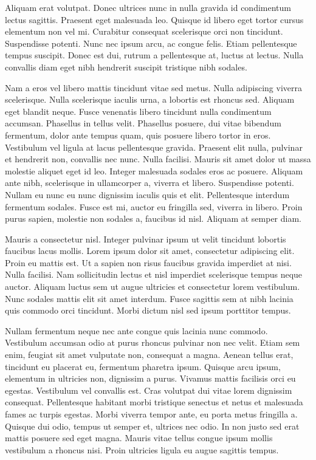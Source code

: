 Aliquam erat volutpat.
Donec ultrices nunc in nulla gravida id condimentum lectus sagittis.
Praesent eget malesuada leo.
Quisque id libero eget tortor cursus elementum non vel mi.
Curabitur consequat scelerisque orci non tincidunt.
Suspendisse potenti.
Nunc nec ipsum arcu, ac congue felis.
Etiam pellentesque tempus suscipit.
Donec est dui, rutrum a pellentesque at, luctus at lectus.
Nulla convallis diam eget nibh hendrerit suscipit tristique nibh sodales.

Nam a eros vel libero mattis tincidunt vitae sed metus.
Nulla adipiscing viverra scelerisque.
Nulla scelerisque iaculis urna, a lobortis est rhoncus sed.
Aliquam eget blandit neque.
Fusce venenatis libero tincidunt nulla condimentum accumsan.
Phasellus in tellus velit.
Phasellus posuere, dui vitae bibendum fermentum, dolor ante tempus quam, quis posuere libero tortor in eros.
Vestibulum vel ligula at lacus pellentesque gravida.
Praesent elit nulla, pulvinar et hendrerit non, convallis nec nunc.
Nulla facilisi.
Mauris sit amet dolor ut massa molestie aliquet eget id leo.
Integer malesuada sodales eros ac posuere.
Aliquam ante nibh, scelerisque in ullamcorper a, viverra et libero.
Suspendisse potenti.
Nullam eu nunc eu nunc dignissim iaculis quis et elit.
Pellentesque interdum fermentum sodales.
Fusce est mi, auctor eu fringilla sed, viverra in libero.
Proin purus sapien, molestie non sodales a, faucibus id nisl.
Aliquam at semper diam.

Mauris a consectetur nisl.
Integer pulvinar ipsum ut velit tincidunt lobortis faucibus lacus mollis.
Lorem ipsum dolor sit amet, consectetur adipiscing elit.
Proin eu mattis est.
Ut a sapien non risus faucibus gravida imperdiet at nisi.
Nulla facilisi.
Nam sollicitudin lectus et nisl imperdiet scelerisque tempus neque auctor.
Aliquam luctus sem ut augue ultricies et consectetur lorem vestibulum.
Nunc sodales mattis elit sit amet interdum.
Fusce sagittis sem at nibh lacinia quis commodo orci tincidunt.
Morbi dictum nisl sed ipsum porttitor tempus.

Nullam fermentum neque nec ante congue quis lacinia nunc commodo.
Vestibulum accumsan odio at purus rhoncus pulvinar non nec velit.
Etiam sem enim, feugiat sit amet vulputate non, consequat a magna.
Aenean tellus erat, tincidunt eu placerat eu, fermentum pharetra ipsum.
Quisque arcu ipsum, elementum in ultricies non, dignissim a purus.
Vivamus mattis facilisis orci eu egestas.
Vestibulum vel convallis est.
Cras volutpat dui vitae lorem dignissim consequat.
Pellentesque habitant morbi tristique senectus et netus et malesuada fames ac turpis egestas.
Morbi viverra tempor ante, eu porta metus fringilla a.
Quisque dui odio, tempus ut semper et, ultrices nec odio.
In non justo sed erat mattis posuere sed eget magna.
Mauris vitae tellus congue ipsum mollis vestibulum a rhoncus nisi.
Proin ultricies ligula eu augue sagittis tempus.

